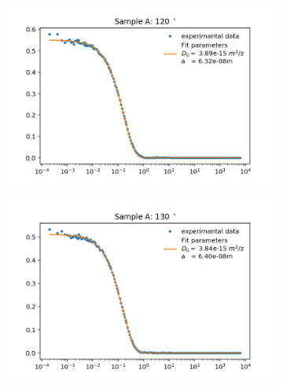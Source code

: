 \documentclass[]{article}
\begin{document}
\begin{figure}[!h]
\medskip
\begin{subfigure}{0.48\textwidth}
\includegraphics[width=\linewidth]{Plots/A/120.png}
\end{subfigure}
\begin{subfigure}[c]{0.48\linewidth}
\includegraphics[width=\linewidth]{Plots/A/130.png}
\end{subfigure}


\end{figure}
\end{document}
